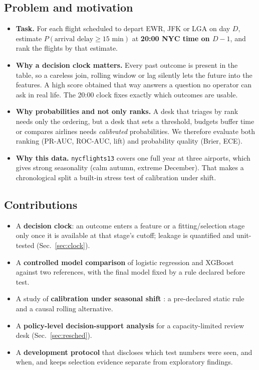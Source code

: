 \documentclass[conference]{IEEEtran}
\begin{document}
\subsection{Problem and motivation}
\begin{itemize}
\item \textbf{Task.} For each flight scheduled to depart EWR, JFK or LGA on day $D$, estimate $P(\text{arrival delay}\ge15\text{ min})$ at \textbf{20:00 NYC time on $D-1$}, and rank the flights by that estimate.
\item \textbf{Why a decision clock matters.} Every past outcome is present in the table, so a careless join, rolling window or lag silently lets the future into the features. A high score obtained that way answers a question no operator can ask in real life. The 20:00 clock fixes exactly which outcomes are usable.
\item \textbf{Why probabilities and not only ranks.} A desk that triages by rank needs only the ordering, but a desk that sets a threshold, budgets buffer time or compares airlines needs \emph{calibrated} probabilities. We therefore evaluate both ranking (PR-AUC, ROC-AUC, lift) and probability quality (Brier, ECE).
\item \textbf{Why this data.} \texttt{nycflights13} covers one full year at three airports, which gives strong seasonality (calm autumn, extreme December). That makes a chronological split a built-in stress test of calibration under shift.
\end{itemize}

\subsection{Contributions}
\begin{itemize}
\item A \textbf{decision clock}: an outcome enters a feature or a fitting/selection stage only once it is available at that stage's cutoff; leakage is quantified and unit-tested (Sec.~\ref{sec:clock}).
\item A \textbf{controlled model comparison} of logistic regression and XGBoost \cite{chen2016xgboost} against two references, with the final model fixed by a rule declared before test.
\item A study of \textbf{calibration under seasonal shift} \cite{guo2017calibration,ovadia2019shift}: a pre-declared static rule and a causal rolling alternative.
\item A \textbf{policy-level decision-support analysis} for a capacity-limited review desk (Sec.~\ref{sec:resched}).
\item A \textbf{development protocol} that discloses which test numbers were seen, and when, and keeps selection evidence separate from exploratory findings.
\end{itemize}
\end{document}
